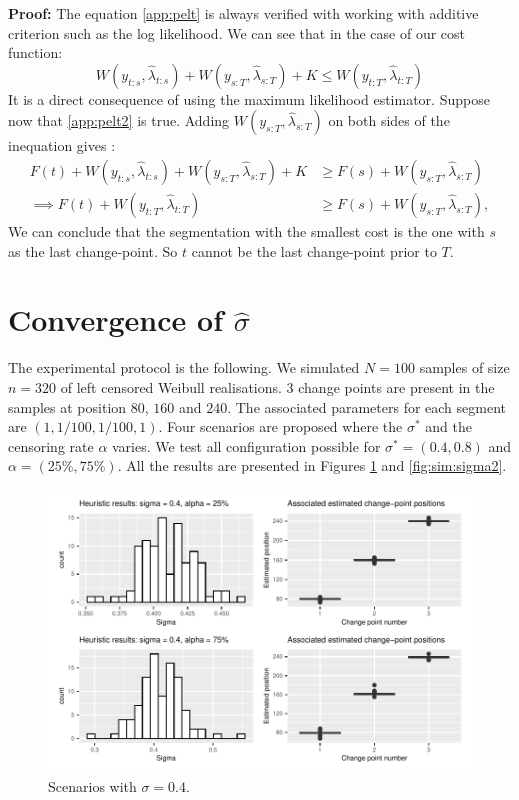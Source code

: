 \begin{appendices}
\textbf{Proof:} The equation \ref{app:pelt} is always verified with working with additive criterion such as the log likelihood. We can see that in the case of our cost function: 
$$W(y_{t:s},\hat\lambda_{t:s})+W(y_{s:T},\hat\lambda_{s:T})+K\leq W(y_{t:T},\hat\lambda_{t:T})$$
It is a direct consequence of using the maximum likelihood estimator. Suppose now that \ref{app:pelt2} is true. Adding $W(y_{s:T},\hat\lambda_{s:T})$ on both sides of the inequation gives : 
\begin{align*}
  F(t)+W(y_{t:s},\hat\lambda_{t:s})+W(y_{s:T},\hat\lambda_{s:T})+K &\geq F(s)+W(y_{s:T},\hat\lambda_{s:T}) \\
  \implies F(t)+W(y_{t:T},\hat\lambda_{t:T}) &\geq F(s)+W(y_{s:T},\hat\lambda_{s:T}),
\end{align*}
We can conclude that the segmentation with the smallest cost is the one with $s$ as the last change-point. So $t$ cannot be the last change-point prior to $T$.


\section{Convergence of \texorpdfstring{$\hat\sigma$}{s}}\label{app:chap4:4}

The experimental protocol is the following. We simulated $N = 100$ samples of size $n = 320$ of left censored Weibull realisations. 3 change points are present in the samples at position $80$, $160$ and $240$. The associated parameters for each segment are $(1,1/100,1/100,1)$. Four scenarios are proposed where the $\sigma^*$ and the censoring rate $\alpha$ varies. We test all configuration possible for $\sigma^* = (0.4,0.8)$ and $\alpha = (25\%,75\%)$. All the results are presented in Figures \ref{fig:sim:sigma1} and \ref{fig:sim:sigma2}.     

\begin{figure}[ht]
    \centering
    \includegraphics{figs/App/SIM_CHAP5_1.pdf}
    \caption{Scenarios with $\sigma = 0.4$.}
    \label{fig:sim:sigma1}
\end{figure}


\end{appendices}
